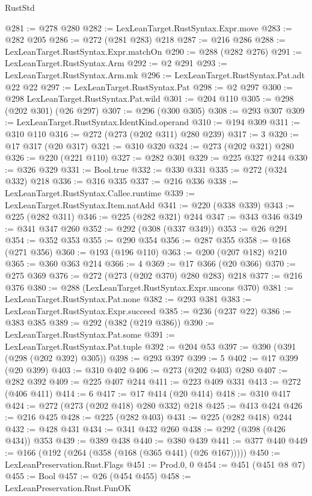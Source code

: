 \begin{lexlean}{RustStd}
\begin{coremodule}
{\begin{coremodule}
{{{{{{{@281 := @278 @280
@282 := LexLeanTarget.RustSyntax.Expr.move
@283 := @282 @205
@286 := @272 (@281 @283) @218
@287 := @216 @286
@288 := LexLeanTarget.RustSyntax.Expr.matchOn
@290 := @288 (@282 @276)
@291 := LexLeanTarget.RustSyntax.Arm
@292 := @2 @291
@293 := LexLeanTarget.RustSyntax.Arm.mk
@296 := LexLeanTarget.RustSyntax.Pat.adt @22 @22
@297 := LexLeanTarget.RustSyntax.Pat
@298 := @2 @297
@300 := @298 LexLeanTarget.RustSyntax.Pat.wild
@301 := @204 @110
@305 := @298 (@202 @301) (@26 @297)
@307 := @296 (@300 @305)
@308 := @293 @307
@309 := LexLeanTarget.RustSyntax.IdentKind.operand
@310 := @194 @309
@311 := @310 @110
@316 := @272 (@273 (@202 @311) @280 @239)
@317 := 3
@320 := @17 @317 (@20 @317)
@321 := @310 @320
@324 := @273 (@202 @321) @280
@326 := @220 (@221 @110)
@327 := @282 @301
@329 := @225 @327 @244
@330 := @326 @329
@331 := Bool.true
@332 := @330 @331
@335 := @272 (@324 @332) @218
@336 := @316 @335
@337 := @216 @336
@338 := LexLeanTarget.RustSyntax.Callee.runtime
@339 := LexLeanTarget.RustSyntax.Item.natAdd
@341 := @220 (@338 @339)
@343 := @225 (@282 @311)
@346 := @225 (@282 @321) @244
@347 := @343 @346
@349 := @341 @347 @260
@352 := @292 (@308 (@337 @349))
@353 := @26 @291
@354 := @352 @353
@355 := @290 @354
@356 := @287 @355
@358 := @168 (@271 @356)
@360 := @193 (@196 @110)
@363 := @200 (@207 @182) @210
@365 := @360 @363 @214
@366 := 4
@369 := @17 @366 (@20 @366)
@370 := @275 @369
@376 := @272 (@273 (@202 @370) @280 @283) @218
@377 := @216 @376
@380 := @288 (LexLeanTarget.RustSyntax.Expr.uncons @370)
@381 := LexLeanTarget.RustSyntax.Pat.none
@382 := @293 @381
@383 := LexLeanTarget.RustSyntax.Expr.succeed
@385 := @236 (@237 @22)
@386 := @383 @385
@389 := @292 (@382 (@219 @386))
@390 := LexLeanTarget.RustSyntax.Pat.some
@391 := LexLeanTarget.RustSyntax.Pat.tuple
@392 := @204 @53
@397 := @390 (@391 (@298 (@202 @392) @305))
@398 := @293 @397
@399 := 5
@402 := @17 @399 (@20 @399)
@403 := @310 @402
@406 := @273 (@202 @403) @280
@407 := @282 @392
@409 := @225 @407 @244
@411 := @223 @409 @331
@413 := @272 (@406 @411)
@414 := 6
@417 := @17 @414 (@20 @414)
@418 := @310 @417
@424 := @272 (@273 (@202 @418) @280 @332) @218
@425 := @413 @424
@426 := @216 @425
@428 := @225 (@282 @403)
@431 := @225 (@282 @418) @244
@432 := @428 @431
@434 := @341 @432 @260
@438 := @292 (@398 (@426 @434)) @353
@439 := @389 @438
@440 := @380 @439
@441 := @377 @440
@449 := @166 (@192 (@264 (@358 (@168 (@365 @441) (@26 @167)))))
@450 := LexLeanPreservation.Rust.Flags
@451 := Prod.{0, 0}
@454 := @451 (@451 @8 @7)
@455 := Bool
@457 := @26 (@454 @455)
@458 := LexLeanPreservation.Rust.FunOK
}}}}}}}
\end{coremodule}}
\end{coremodule}
\end{lexlean}
